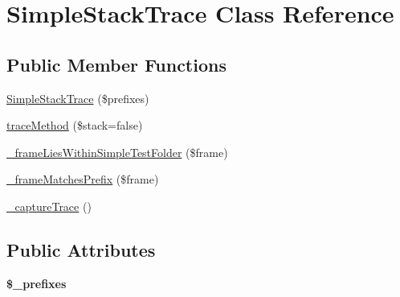 \hypertarget{class_simple_stack_trace}{
\section{SimpleStackTrace Class Reference}
\label{class_simple_stack_trace}
}
\subsection*{Public Member Functions}
\begin{DoxyCompactItemize}
\item 
\hyperlink{class_simple_stack_trace_a0d1dea001f052dfadb2e67892002bd1e}{SimpleStackTrace} (\$prefixes)
\item 
\hyperlink{class_simple_stack_trace_a56b36eeb068dc6552cf000b7e4217040}{traceMethod} (\$stack=false)
\item 
\hyperlink{class_simple_stack_trace_a3dfd46c09d9234667d42ef0ed6eadeda}{\_\-frameLiesWithinSimpleTestFolder} (\$frame)
\item 
\hyperlink{class_simple_stack_trace_a0789e56a3e37b581790028a929ffa93e}{\_\-frameMatchesPrefix} (\$frame)
\item 
\hyperlink{class_simple_stack_trace_acf1e0c12244f696aa14d6073fd452def}{\_\-captureTrace} ()
\end{DoxyCompactItemize}
\subsection*{Public Attributes}
\begin{DoxyCompactItemize}
\item 
\hypertarget{class_simple_stack_trace_a951eb8bcce43545187e9472d206fc7a2}{
{\bfseries \$\_\-prefixes}}
\label{class_simple_stack_trace_a951eb8bcce43545187e9472d206fc7a2}

\end{DoxyCompactItemize}


